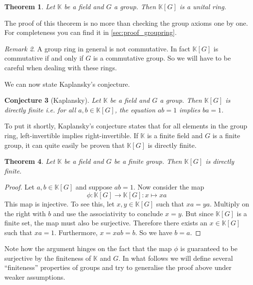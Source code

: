 \documentclass[titlepage, a4paper]{article}
\newtheorem{theorem}{Theorem}[section]
\newtheorem{conjecture}[theorem]{Conjecture}
\theoremstyle{remark}
\newtheorem{remark}[theorem]{Remark}
\begin{document}
\begin{theorem}
    Let $\mathbb K$ be a field and $G$ a group. Then $\mathbb K[G]$ is a unital ring.
\end{theorem}
The proof of this theorem is no more than checking the group axioms one by one. For completeness you can find it in \cref{sec:proof_groupring}.

\begin{remark}
	A group ring in general is not commutative. In fact $\mathbb{K}[G]$ is commutative if and only if $G$ is a commutative group. So we will have to be careful when dealing with these rings. 
\end{remark}
We can now state Kaplansky's conjecture.

\begin{conjecture}[Kaplansky]
    Let $\mathbb K$ be a field and $G$ a group. Then $\mathbb K[G]$ is directly finite i.e. for all $a, b \in \mathbb K[G]$, the equation $ab=1$ implies $ba=1$.
\end{conjecture}

To put it shortly, Kaplansky's conjecture states that for all elements in the group ring, left-invertible implies right-invertible. If $\mathbb K$ is a finite field and $G$ is a finite group, it can quite easily be proven that $\mathbb K[G]$ is directly finite.

\begin{theorem}
    Let $\mathbb K$ be a field and $G$ be a finite group. Then $\mathbb K[G]$ is directly finite. %
\end{theorem}
\begin{proof}
    Let $a, b \in \mathbb K[G]$ and suppose $ab=1$. Now consider the map
    \[
        \phi: \mathbb K[G] \to \mathbb K[G]: x \mapsto x a
    \]
    This map is injective. To see this, let $x, y \in \mathbb K[G]$ such that $xa=ya$. Multiply on the right with $b$ and use the associativity to conclude $x=y$.
    But since $\mathbb K[G]$ is a finite set, the map must also be surjective. Therefore there exists an $x \in \mathbb K[G]$ such that $x a = 1$. Furthermore, $x = xab = b$. So we have $b=a$.
\end{proof}

Note how the argument hinges on the fact that the map $\phi$ is guaranteed to be surjective by the finiteness of $\mathbb K$ and $G$. In what follows we will define several ``finiteness'' properties of groups and try to generalise the proof above under weaker assumptions.
\end{document}
